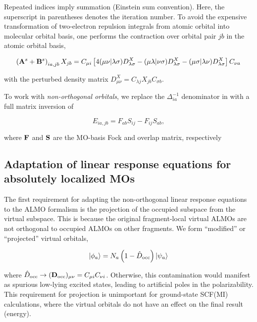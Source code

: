 Repeated indices imply summation (Einstein sum convention). Here, the superscript in parentheses denotes the iteration number. To avoid the expensive transformation of two-electron repulsion integrals from atomic orbital into molecular orbital basis, one performs the contraction over orbital pair \(jb\) in the atomic orbital basis,

\begin{equation}
  \left(\mathbf{A}^{s} + \mathbf{B}^{s}\right)_{ia,jb} X_{jb}
  =
  C_{\mu i}
  \left[
    4 (\mu\nu|\lambda\sigma) D_{\lambda\sigma}^{X}
    - (\mu\lambda|\nu\sigma) D_{\lambda\sigma}^{X}
    - (\mu\sigma|\lambda\nu) D_{\lambda\sigma}^{X}
  \right]
  C_{\nu a}
\end{equation}

with the perturbed density matrix \(D_{\mu\nu}^{X} = C_{\lambda j} X_{jb} C_{\sigma b}\).

To work with \emph{non-orthogonal orbitals}, we replace the \(\Delta_{ia}^{-1}\) denominator in  with a full matrix inversion of

\begin{equation}
  \label{eq:energy-denominator}
  E_{ia,jb} = F_{ab}S_{ij} - F_{ij}S_{ab},
\end{equation}

where \(\mathbf{F}\) and \(\mathbf{S}\) are the MO-basis Fock and overlap matrix, respectively

\subsection{Adaptation of linear response equations for absolutely localized MOs}
\label{ssec:almo-adaptation}

The first requirement for adapting the non-orthogonal linear response equations to the ALMO formalism is the projection of the occupied subspace from the virtual subspace. This is because the original fragment-local virtual ALMOs are not orthogonal to occupied ALMOs on other fragments. We form ``modified'' or ``projected'' virtual orbitals,

\begin{equation}
  \label{eq:projected-virtuals}
  \ket{\phi_{a}} = N_{a} \left( 1 - \hat{D}_{\text{occ}} \right) \ket{\psi_{a}}
\end{equation}

where \(\hat{D}_{\text{occ}} \rightarrow (\mathbf{D}_{\text{occ}})_{\mu\nu} = C_{\mu i} C_{\nu i}\). Otherwise, this contamination would manifest as spurious low-lying excited states, leading to artificial poles in the polarizability. This requirement for projection is unimportant for ground-state SCF(MI) calculations, where the virtual orbitals do not have an effect on the final result (energy).

